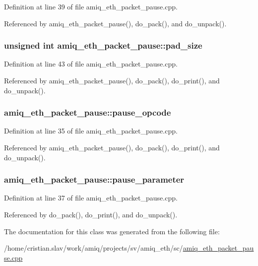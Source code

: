 Definition at line 39 of file amiq\_\-eth\_\-packet\_\-pause.cpp.

Referenced by amiq\_\-eth\_\-packet\_\-pause(), do\_\-pack(), and do\_\-unpack().\hypertarget{classamiq__eth__packet__pause_ab2323424453362f82d9fc86ee9667e46}{
\subsubsection[{pad\_\-size}]{\setlength{\rightskip}{0pt plus 5cm}unsigned int {\bf amiq\_\-eth\_\-packet\_\-pause::pad\_\-size}}}
\label{classamiq__eth__packet__pause_ab2323424453362f82d9fc86ee9667e46}


Definition at line 43 of file amiq\_\-eth\_\-packet\_\-pause.cpp.

Referenced by amiq\_\-eth\_\-packet\_\-pause(), do\_\-pack(), do\_\-print(), and do\_\-unpack().\hypertarget{classamiq__eth__packet__pause_a31d48860ec5bc33e5e3c76a88a5cbd94}{
\subsubsection[{pause\_\-opcode}]{ {\bf amiq\_\-eth\_\-packet\_\-pause::pause\_\-opcode}}}
\label{classamiq__eth__packet__pause_a31d48860ec5bc33e5e3c76a88a5cbd94}


Definition at line 35 of file amiq\_\-eth\_\-packet\_\-pause.cpp.

Referenced by amiq\_\-eth\_\-packet\_\-pause(), do\_\-pack(), do\_\-print(), and do\_\-unpack().\hypertarget{classamiq__eth__packet__pause_ab767bf1d61f35e59a74babfe730ffe20}{
\subsubsection[{pause\_\-parameter}]{ {\bf amiq\_\-eth\_\-packet\_\-pause::pause\_\-parameter}}}
\label{classamiq__eth__packet__pause_ab767bf1d61f35e59a74babfe730ffe20}


Definition at line 37 of file amiq\_\-eth\_\-packet\_\-pause.cpp.

Referenced by do\_\-pack(), do\_\-print(), and do\_\-unpack().

The documentation for this class was generated from the following file:\begin{DoxyCompactItemize}
\item 
/home/cristian.slav/work/amiq/projects/sv/amiq\_\-eth/sc/\hyperlink{amiq__eth__packet__pause_8cpp}{amiq\_\-eth\_\-packet\_\-pause.cpp}\end{DoxyCompactItemize}
